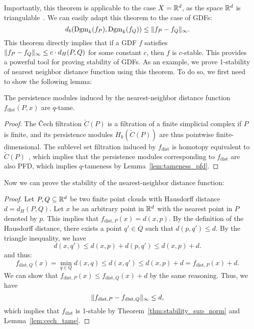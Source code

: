 Importantly, this theorem is applicable to the case $X = \mathbb{R}^d$, as the space
$\mathbb{R}^d$ is triangulable~\cite{moise2013geometric}. We can easily adapt this
theorem to the case of GDFs:
\begin{equation}
    d_b(\operatorname{Dgm}_k(f_P), \operatorname{Dgm}_k(f_Q)) \leq \lVert f_P - f_Q\rVert_{\infty}.
\end{equation}
This theorem directly implies that if a GDF $f$ satisfies
$\lVert f_P - f_Q\rVert_\infty \leq c \cdot d_H(P, Q)$ for some constant $c$, then
$f$ is $c$-stable. This provides a powerful tool for proving stability of GDFs.
As an example, we prove 1-stability of nearest neighbor distance function using
this theorem. To do so, we first need to show the following lemma:
\begin{lemma}
    \label{lem:cech_tame}
    The persistence modules induced by the nearest-neighbor distance function
    $f_{\mathrm{dist}}(P, x)$ are $q$-tame.
\end{lemma}
\begin{proof}
    The \v{C}ech filtration $\check{C}(P)$ is a filtration of a finite
    simplicial complex if $P$ is finite, and its persistence modules
    $H_k(\check{C}(P))$ are thus pointwise finite-dimensional. The sublevel set
    filtration induced by $f_{\mathrm{dist}}$ is homotopy equivalent to
    $\check{C}(P)$~\cite{schnider2024introduction}, which implies that the
    persistence modules corresponding to $f_{\mathrm{dist}}$ are also PFD, which
    implies $q$-tameness by Lemma~\ref{lem:tameness_pfd}.
\end{proof}
Now we can prove the stability of the nearest-neighbor distance function:
\begin{proof}
    Let $P, Q \subseteq \mathbb{R}^d$ be two finite point clouds with Hausdorff distance
    $d = d_H(P, Q)$. Let $x$ be an arbitrary point in $\mathbb{R}^d$ with the nearest
    point in $P$ denoted by $p$. This implies that $f_{\mathrm{dist}, P}(x) =
    d(x, p)$.  By the definition of the Hausdorff distance, there exists a point
    $q' \in Q$ such that $d(p, q') \leq d$. By the triangle inequality, we have
    \begin{equation}
        d(x, q') \leq d(x, p) + d(p, q') \leq d(x, p) + d.
    \end{equation}
    and thus:
    \begin{equation}
        f_{\mathrm{dist}, Q}(x) = \min_{q \in Q} d(x, q) \leq d(x, q') \leq d(x, p) + d = f_{\mathrm{dist}, P}(x) + d.
    \end{equation}
    We can show that $f_{\mathrm{dist}, P}(x) \leq f_{\mathrm{dist}, Q}(x) + d$
    by the same reasoning. Thus, we have
    \begin{equation}
        \lVert f_{\mathrm{dist}, P} - f_{\mathrm{dist}, Q}\rVert_\infty \leq d,
    \end{equation}
    which implies that $f_{\mathrm{dist}}$ is 1-stable by
    Theorem~\ref{thm:stability_sup_norm} and Lemma~\ref{lem:cech_tame}.
\end{proof}

